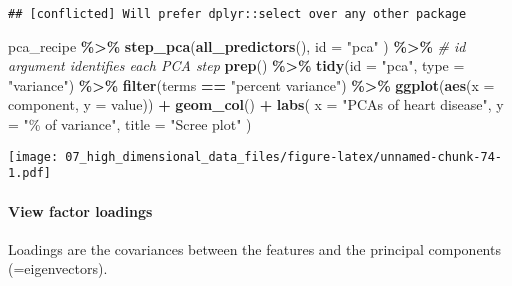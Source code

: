 \documentclass[
]{book}
\newenvironment{Shaded}{\begin{snugshade}}{\end{snugshade}}
\newcommand{\CommentTok}[1]{\textcolor[rgb]{0.56,0.35,0.01}{\textit{#1}}}
\newcommand{\DataTypeTok}[1]{\textcolor[rgb]{0.13,0.29,0.53}{#1}}
\newcommand{\KeywordTok}[1]{\textcolor[rgb]{0.13,0.29,0.53}{\textbf{#1}}}
\newcommand{\NormalTok}[1]{#1}
\newcommand{\OperatorTok}[1]{\textcolor[rgb]{0.81,0.36,0.00}{\textbf{#1}}}
\newcommand{\StringTok}[1]{\textcolor[rgb]{0.31,0.60,0.02}{#1}}
\begin{document}
\begin{verbatim}
## [conflicted] Will prefer dplyr::select over any other package
\end{verbatim}

\begin{Shaded}
\begin{Highlighting}[]
\NormalTok{pca\_recipe }\OperatorTok{\%\textgreater{}\%}
\StringTok{  }\KeywordTok{step\_pca}\NormalTok{(}\KeywordTok{all\_predictors}\NormalTok{(),}
    \DataTypeTok{id =} \StringTok{"pca"}
\NormalTok{  ) }\OperatorTok{\%\textgreater{}\%}\StringTok{ }\CommentTok{\# id argument identifies each PCA step}
\StringTok{  }\KeywordTok{prep}\NormalTok{() }\OperatorTok{\%\textgreater{}\%}
\StringTok{  }\KeywordTok{tidy}\NormalTok{(}\DataTypeTok{id =} \StringTok{"pca"}\NormalTok{, }\DataTypeTok{type =} \StringTok{"variance"}\NormalTok{) }\OperatorTok{\%\textgreater{}\%}
\StringTok{  }\KeywordTok{filter}\NormalTok{(terms }\OperatorTok{==}\StringTok{ "percent variance"}\NormalTok{) }\OperatorTok{\%\textgreater{}\%}
\StringTok{  }\KeywordTok{ggplot}\NormalTok{(}\KeywordTok{aes}\NormalTok{(}\DataTypeTok{x =}\NormalTok{ component, }\DataTypeTok{y =}\NormalTok{ value)) }\OperatorTok{+}
\StringTok{  }\KeywordTok{geom\_col}\NormalTok{() }\OperatorTok{+}
\StringTok{  }\KeywordTok{labs}\NormalTok{(}
    \DataTypeTok{x =} \StringTok{"PCAs of heart disease"}\NormalTok{,}
    \DataTypeTok{y =} \StringTok{"\% of variance"}\NormalTok{,}
    \DataTypeTok{title =} \StringTok{"Scree plot"}
\NormalTok{  )}
\end{Highlighting}
\end{Shaded}

\texttt{[image: 07\_high\_dimensional\_data\_files/figure-latex/unnamed-chunk-74-1.pdf]}

\hypertarget{view-factor-loadings}{%
\paragraph{View factor loadings}\label{view-factor-loadings}}

Loadings are the covariances between the features and the principal components (=eigenvectors).
\end{document}
